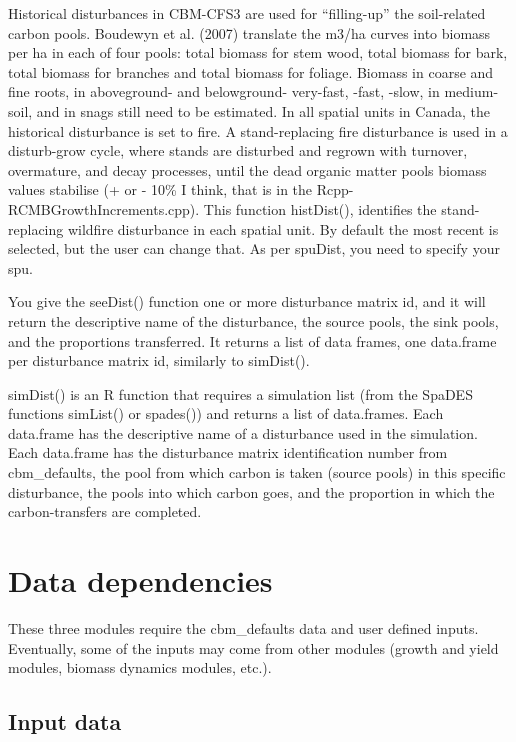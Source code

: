 \documentclass[]{article}
\begin{document}
Historical disturbances in CBM-CFS3 are used for ``filling-up'' the
soil-related carbon pools. Boudewyn et al. (2007) translate the m3/ha
curves into biomass per ha in each of four pools: total biomass for stem
wood, total biomass for bark, total biomass for branches and total
biomass for foliage. Biomass in coarse and fine roots, in aboveground-
and belowground- very-fast, -fast, -slow, in medium-soil, and in snags
still need to be estimated. In all spatial units in Canada, the
historical disturbance is set to fire. A stand-replacing fire
disturbance is used in a disturb-grow cycle, where stands are disturbed
and regrown with turnover, overmature, and decay processes, until the
dead organic matter pools biomass values stabilise (+ or - 10\% I think,
that is in the Rcpp-RCMBGrowthIncrements.cpp). This function histDist(),
identifies the stand-replacing wildfire disturbance in each spatial
unit. By default the most recent is selected, but the user can change
that. As per spuDist, you need to specify your spu.

You give the seeDist() function one or more disturbance matrix id, and
it will return the descriptive name of the disturbance, the source
pools, the sink pools, and the proportions transferred. It returns a
list of data frames, one data.frame per disturbance matrix id, similarly
to simDist().

simDist() is an R function that requires a simulation list (from the
SpaDES functions simList() or spades()) and returns a list of
data.frames. Each data.frame has the descriptive name of a disturbance
used in the simulation. Each data.frame has the disturbance matrix
identification number from cbm\_defaults, the pool from which carbon is
taken (source pools) in this specific disturbance, the pools into which
carbon goes, and the proportion in which the carbon-transfers are
completed.

\section{Data dependencies}\label{data-dependencies}

These three modules require the cbm\_defaults data and user defined
inputs. Eventually, some of the inputs may come from other modules
(growth and yield modules, biomass dynamics modules, etc.).

\subsection{Input data}\label{input-data}
\end{document}
